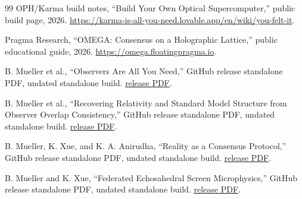 \documentclass[11pt]{article}
\theoremstyle{definition}
\theoremstyle{remark}
\newcommand{\OPHPaperReleaseID}{standalone}
\newcommand{\OPHPaperReleaseDate}{undated standalone build}
\begin{document}
\begin{thebibliography}{99}
OPH/Karma build notes,
``Build Your Own Optical Supercomputer,''
public build page, 2026.
\url{https://karma-is-all-you-need.lovable.app/en/wiki/you-felt-it}.

Pragma Research,
``OMEGA: Consensus on a Holographic Lattice,''
public educational guide, 2026.
\url{https://omega.floatingpragma.io}.

B. Mueller et al.,
``Observers Are All You Need,''
GitHub release \OPHPaperReleaseID{} PDF, \OPHPaperReleaseDate.
\href{https://github.com/FloatingPragma/observer-patch-holography/releases/download/\OPHPaperReleaseID/observers_are_all_you_need.pdf}{release PDF}.

B. Mueller et al.,
``Recovering Relativity and Standard Model Structure from Observer Overlap
Consistency,''
GitHub release \OPHPaperReleaseID{} PDF, \OPHPaperReleaseDate.
\href{https://github.com/FloatingPragma/observer-patch-holography/releases/download/\OPHPaperReleaseID/recovering_relativity_and_standard_model_structure_from_observer_overlap_consistency_compact.pdf}{release PDF}.

B. Mueller, K. Xue, and K. A. Anirudha,
``Reality as a Consensus Protocol,''
GitHub release \OPHPaperReleaseID{} PDF, \OPHPaperReleaseDate.
\href{https://github.com/FloatingPragma/observer-patch-holography/releases/download/\OPHPaperReleaseID/reality_as_consensus_protocol.pdf}{release PDF}.

B. Mueller and K. Xue,
``Federated Echosahedral Screen Microphysics,''
GitHub release \OPHPaperReleaseID{} PDF, \OPHPaperReleaseDate.
\href{https://github.com/FloatingPragma/observer-patch-holography/releases/download/\OPHPaperReleaseID/screen_microphysics_and_observer_synchronization.pdf}{release PDF}.

\end{thebibliography}
\end{document}

